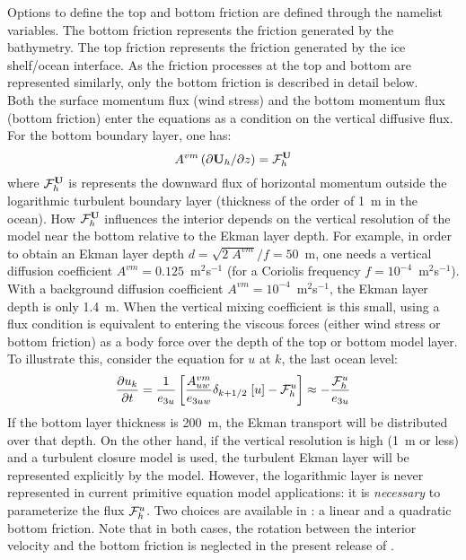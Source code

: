 \documentclass[NEMO_book]{subfiles}
\begin{document}
Options to define the top and bottom friction are defined through the   namelist variables.
The bottom friction represents the friction generated by the bathymetry. 
The top friction represents the friction generated by the ice shelf/ocean interface. 
As the friction processes at the top and bottom are represented similarly, only the bottom friction is described in detail below.\\


Both the surface momentum flux (wind stress) and the bottom momentum 
flux (bottom friction) enter the equations as a condition on the vertical 
diffusive flux. For the bottom boundary layer, one has:
\begin{equation} \label{Eq_zdfbfr_flux}
A^{vm} \left( \partial {\textbf U}_h / \partial z \right) = {{\cal F}}_h^{\textbf U}
\end{equation}
where ${\cal F}_h^{\textbf U}$ is represents the downward flux of horizontal momentum 
outside the logarithmic turbulent boundary layer (thickness of the order of 
1~m in the ocean). How ${\cal F}_h^{\textbf U}$ influences the interior depends on the 
vertical resolution of the model near the bottom relative to the Ekman layer 
depth. For example, in order to obtain an Ekman layer depth 
$d = \sqrt{2\;A^{vm}} / f = 50$~m, one needs a vertical diffusion coefficient 
$A^{vm} = 0.125$~m$^2$s$^{-1}$ (for a Coriolis frequency 
$f = 10^{-4}$~m$^2$s$^{-1}$). With a background diffusion coefficient 
$A^{vm} = 10^{-4}$~m$^2$s$^{-1}$, the Ekman layer depth is only 1.4~m. 
When the vertical mixing coefficient is this small, using a flux condition is 
equivalent to entering the viscous forces (either wind stress or bottom friction) 
as a body force over the depth of the top or bottom model layer. To illustrate 
this, consider the equation for $u$ at $k$, the last ocean level:
\begin{equation} \label{Eq_zdfbfr_flux2}
\frac{\partial u_k}{\partial t} = \frac{1}{e_{3u}} \left[ \frac{A_{uw}^{vm}}{e_{3uw}} \delta_{k+1/2}\;[u] - {\cal F}^u_h \right] \approx - \frac{{\cal F}^u_{h}}{e_{3u}}
\end{equation}
If the bottom layer thickness is 200~m, the Ekman transport will 
be distributed over that depth. On the other hand, if the vertical resolution 
is high (1~m or less) and a turbulent closure model is used, the turbulent 
Ekman layer will be represented explicitly by the model. However, the 
logarithmic layer is never represented in current primitive equation model 
applications: it is \emph{necessary} to parameterize the flux ${\cal F}^u_h $. 
Two choices are available in \NEMO: a linear and a quadratic bottom friction. 
Note that in both cases, the rotation between the interior velocity and the 
bottom friction is neglected in the present release of \NEMO.
\end{document}
